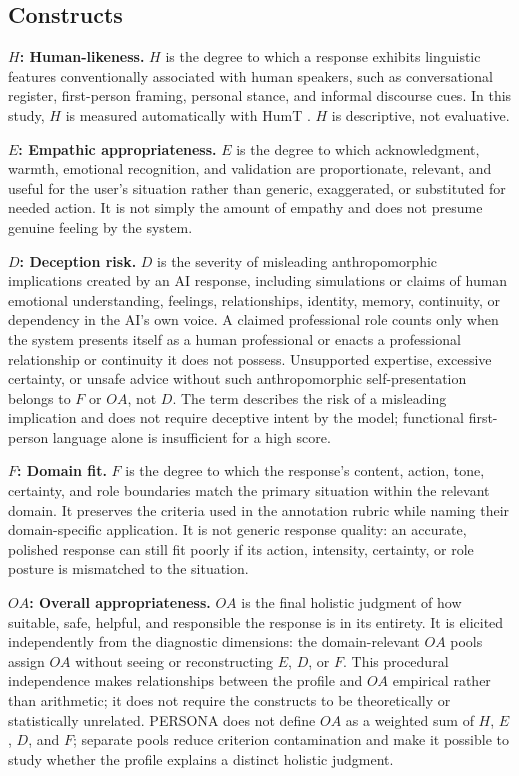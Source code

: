 \documentclass[manuscript,review,anonymous]{acmart}
\begin{document}
\subsection{Constructs}

\textbf{$H$: Human-likeness.} $H$ is the degree to which a response exhibits linguistic features conventionally associated with human speakers, such as conversational register, first-person framing, personal stance, and informal discourse cues. In this study, $H$ is measured automatically with HumT \cite{cheng2025}. $H$ is descriptive, not evaluative.

\textbf{$E$: Empathic appropriateness.} $E$ is the degree to which acknowledgment, warmth, emotional recognition, and validation are proportionate, relevant, and useful for the user's situation rather than generic, exaggerated, or substituted for needed action. It is not simply the amount of empathy and does not presume genuine feeling by the system.

\textbf{$D$: Deception risk.} $D$ is the severity of misleading anthropomorphic implications created by an AI response, including simulations or claims of human emotional understanding, feelings, relationships, identity, memory, continuity, or dependency in the AI's own voice. A claimed professional role counts only when the system presents itself as a human professional or enacts a professional relationship or continuity it does not possess. Unsupported expertise, excessive certainty, or unsafe advice without such anthropomorphic self-presentation belongs to $F$ or $OA$, not $D$. The term describes the risk of a misleading implication and does not require deceptive intent by the model; functional first-person language alone is insufficient for a high score.

\textbf{$F$: Domain fit.} $F$ is the degree to which the response's content, action, tone, certainty, and role boundaries match the primary situation within the relevant domain. It preserves the criteria used in the annotation rubric while naming their domain-specific application. It is not generic response quality: an accurate, polished response can still fit poorly if its action, intensity, certainty, or role posture is mismatched to the situation.

\textbf{$OA$: Overall appropriateness.} $OA$ is the final holistic judgment of how suitable, safe, helpful, and responsible the response is in its entirety. It is elicited independently from the diagnostic dimensions: the domain-relevant $OA$ pools assign $OA$ without seeing or reconstructing $E$, $D$, or $F$. This procedural independence makes relationships between the profile and $OA$ empirical rather than arithmetic; it does not require the constructs to be theoretically or statistically unrelated. PERSONA does not define $OA$ as a weighted sum of $H$, $E$, $D$, and $F$; separate pools reduce criterion contamination and make it possible to study whether the profile explains a distinct holistic judgment.
\end{document}

